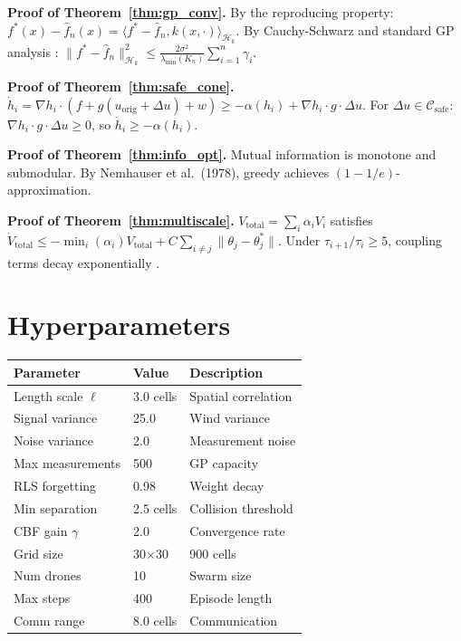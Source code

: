 \documentclass[11pt,twocolumn]{article}
\theoremstyle{definition}
\newcommand{\cH}{\mathcal{H}}
\newcommand{\cC}{\mathcal{C}}
\begin{document}
\textbf{Proof of Theorem~\ref{thm:gp_conv}.} By the reproducing property: $f^*(x) - \hat{f}_n(x) = \langle f^* - \hat{f}_n, k(x, \cdot)\rangle_{\cH_k}$. By Cauchy-Schwarz and standard GP analysis \citep{Srinivas2010}: $\|f^* - \hat{f}_n\|_{\cH_k}^2 \leq \frac{2\sigma^2}{\lambda_{\min}(K_n)} \sum_{i=1}^n \gamma_i$.

\textbf{Proof of Theorem~\ref{thm:safe_cone}.} $\dot{h}_i = \nabla h_i \cdot (f + g(u_{\text{orig}} + \Delta u) + w) \geq -\alpha(h_i) + \nabla h_i \cdot g \cdot \Delta u$. For $\Delta u \in \cC_{\text{safe}}$: $\nabla h_i \cdot g \cdot \Delta u \geq 0$, so $\dot{h}_i \geq -\alpha(h_i)$.

\textbf{Proof of Theorem~\ref{thm:info_opt}.} Mutual information is monotone and submodular. By Nemhauser et al.\ (1978), greedy achieves $(1-1/e)$-approximation.

\textbf{Proof of Theorem~\ref{thm:multiscale}.} $V_{\text{total}} = \sum_i \alpha_i V_i$ satisfies $\dot{V}_{\text{total}} \leq -\min_i(\alpha_i)V_{\text{total}} + C\sum_{i \neq j}\|\theta_j - \theta_j^*\|$. Under $\tau_{i+1}/\tau_i \geq 5$, coupling terms decay exponentially \citep{Khalil2002}.

\section{Hyperparameters}

\begin{table}[h]
\centering
\small
\begin{tabular}{lll}
\toprule
\textbf{Parameter} & \textbf{Value} & \textbf{Description} \\
\midrule
Length scale $\ell$ & 3.0 cells & Spatial correlation \\
Signal variance & 25.0 & Wind variance \\
Noise variance & 2.0 & Measurement noise \\
Max measurements & 500 & GP capacity \\
RLS forgetting & 0.98 & Weight decay \\
Min separation & 2.5 cells & Collision threshold \\
CBF gain $\gamma$ & 2.0 & Convergence rate \\
Grid size & 30$\times$30 & 900 cells \\
Num drones & 10 & Swarm size \\
Max steps & 400 & Episode length \\
Comm range & 8.0 cells & Communication \\
\bottomrule
\end{tabular}
\end{table}
\end{document}
